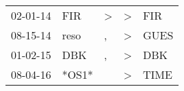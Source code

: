 \begin{supertabular}{p{0.07\textwidth}p{0.06\textwidth}p{0.02\textwidth}p{0.02\textwidth}p{0.06\textwidth}}
 02-01-14\textsuperscript{} &   FIR\textsuperscript{} &  \textgreater &  \textgreater &   FIR\textsuperscript{} \\
 08-15-14\textsuperscript{} &  reso\textsuperscript{} &             , &  \textgreater &  GUES\textsuperscript{} \\
 01-02-15\textsuperscript{} &   DBK\textsuperscript{} &             , &  \textgreater &   DBK\textsuperscript{} \\
 08-04-16\textsuperscript{} &                   *OS1* &               &  \textgreater &  TIME\textsuperscript{} \\
\end{supertabular}
